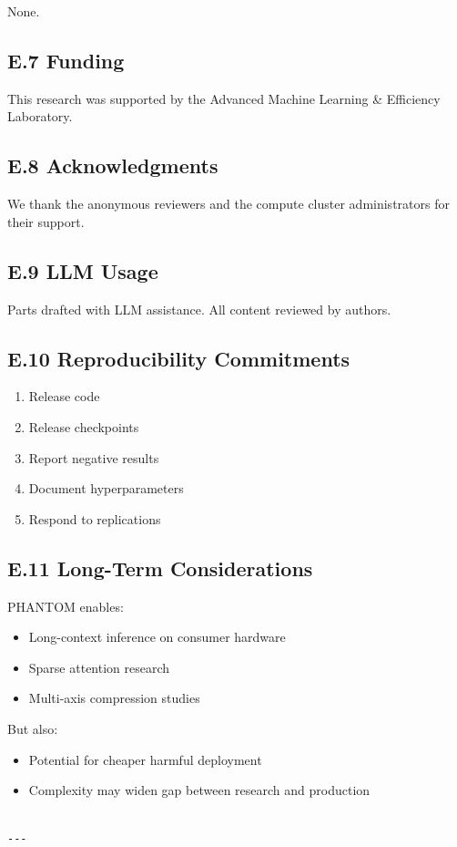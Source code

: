None.

\subsection{E.7 Funding}

This research was supported by the Advanced Machine Learning \& Efficiency Laboratory.

\subsection{E.8 Acknowledgments}

We thank the anonymous reviewers and the compute cluster administrators for their support.

\subsection{E.9 LLM Usage}

Parts drafted with LLM assistance. All content reviewed by authors.

\subsection{E.10 Reproducibility Commitments}

\begin{enumerate}
\item Release code
\item Release checkpoints
\item Report negative results
\item Document hyperparameters
\item Respond to replications

\end{enumerate}
\subsection{E.11 Long-Term Considerations}

PHANTOM enables:
\begin{itemize}
\item Long-context inference on consumer hardware
\item Sparse attention research
\item Multi-axis compression studies

\end{itemize}
But also:
\begin{itemize}
\item Potential for cheaper harmful deployment
\item Complexity may widen gap between research and production
\end{itemize}
\begin{lstlisting}

---
\end{lstlisting}